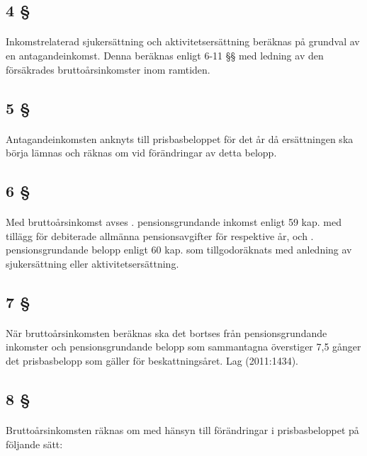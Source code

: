 \documentclass[a4paper,notitlepage,openany,10pt]{book}
\begin{document}
\subsection*{4 §}
\paragraph*{}
Inkomstrelaterad sjukersättning och aktivitetsersättning beräknas på grundval av en antagandeinkomst. Denna beräknas enligt 6-11 §§ med ledning av den försäkrades bruttoårsinkomster inom ramtiden.
\subsection*{5 §}
\paragraph*{}
Antagandeinkomsten anknyts till prisbasbeloppet för det år då ersättningen ska börja lämnas och räknas om vid förändringar av detta belopp.
\subsection*{6 §}
\paragraph*{}
Med bruttoårsinkomst avses
. pensionsgrundande inkomst enligt 59 kap. med tillägg för debiterade allmänna pensionsavgifter för respektive år, och
. pensionsgrundande belopp enligt 60 kap. som tillgodoräknats med anledning av sjukersättning eller aktivitetsersättning.
\subsection*{7 §}
\paragraph*{}
När bruttoårsinkomsten beräknas ska det bortses från pensionsgrundande inkomster och pensionsgrundande belopp som sammantagna överstiger 7,5 gånger det prisbasbelopp som gäller för beskattningsåret.
Lag (2011:1434).
\subsection*{8 §}
\paragraph*{}
Bruttoårsinkomsten räknas om med hänsyn till förändringar i prisbasbeloppet på följande sätt:
\end{document}
